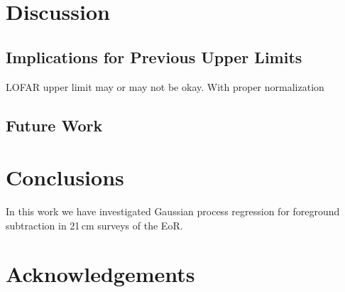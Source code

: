\documentclass[a4paper,fleqn,usenatbib]{mnras}
\begin{document}

\section{Discussion}
\label{sec:discussion}


\subsection{Implications for Previous Upper Limits}

LOFAR upper limit may or may not be okay. With proper normalization



\subsection{Future Work}






\section{Conclusions}
\label{sec:conclusions}

In this work we have investigated Gaussian process regression for foreground subtraction in 21\,cm surveys of the EoR.



\section*{Acknowledgements}











\end{document}
